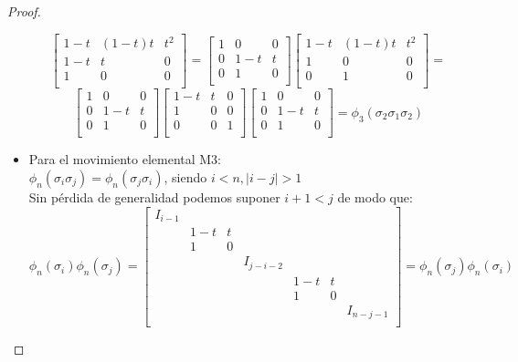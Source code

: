 \begin{proof}
\begin{itemize}
	  	 	\[\begin{bmatrix}
	  	 	1-t& (1-t)t & t^{2}  \\
	  	 	1-t & t & 0 \\
	  	 	1 & 0 & 0 \\
	  	 	\end{bmatrix} = 
	  	 	\begin{bmatrix}
	  	 	1 & 0 & 0 \\
	  	 	0 & 1-t & t \\
	  	 	0 & 1 & 0 \\
	  	 	\end{bmatrix}\begin{bmatrix}
	  	 	1-t & (1-t)t & t^{2}  \\
	  	 	1 & 0 & 0 \\
	  	 	0 & 1 & 0 \\
	  	 	\end{bmatrix}= \]
	  	 	\[\begin{bmatrix}
	  	 	1 & 0 & 0 \\
	  	 	0 & 1-t & t \\
	  	 	0 & 1 & 0 \\
	  	 	\end{bmatrix}\begin{bmatrix}
	  	 	1-t & t & 0  \\
	  	 	1 & 0 & 0 \\
	  	 	0 & 0 & 1 \\
	  	 	\end{bmatrix}\begin{bmatrix}
	  	 	1 & 0 & 0 \\
	  	 	0 & 1-t & t \\
	  	 	0 & 1 & 0 \\
	  	 	\end{bmatrix}= \phi_{3}(\sigma_{2}\sigma_{1}\sigma_{2})\]
	  	 	
	  	 
	 	 \item Para el movimiento elemental M3:\\
	 	 $ \phi_{n}(\sigma_{i}\sigma_{j}) = \phi_{n}(\sigma_{j}\sigma_{i})$, siendo $i<n, |i-j| > 1$\\
	 	 Sin pérdida de generalidad podemos suponer $ i+1<j $ de modo que:
	 	 \[ \phi_{n} (\sigma_{i}) \phi_{n} (\sigma_{j}) = \begin{bmatrix}
	 	 I_{i-1} &  &  & \\
	 	 & 1-t & t &  \\
	 	 & 1 & 0 &  \\
	 	 &  &  & I_{j-i-2} \\
	 	 & & & & 1-t & t &  \\
	 	 & & & & 1 & 0 &  \\
	 	 & & & & & & I_{n-j-1}  \\
	 	 \end{bmatrix}= \phi_{n} (\sigma_{j}) \phi_{n} (\sigma_{i})\]
 	 \end{itemize}
 	 

\end{proof}
